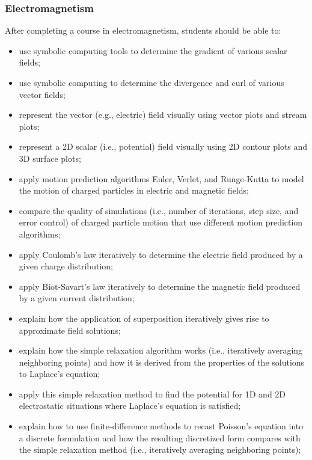 \documentclass[graybox,envcountchap,sectrefs]{svmult}
\begin{document}
\subsubsection{Electromagnetism}
After completing a course in electromagnetism, students should be able to:
\begin{itemize}
\item use symbolic computing  tools to determine the gradient of various scalar fields;

\item use symbolic computing  to determine the divergence and curl of various vector fields;

\item represent the vector (e.g., electric) field visually using vector plots and stream plots;

\item represent a 2D scalar (i.e., potential) field visually using 2D contour plots and 3D surface plots;

\item apply motion prediction algorithms Euler, Verlet, and Runge-Kutta to model the motion of charged particles in electric and magnetic fields;

\item compare the quality of simulations (i.e., number of iterations, step size, and error control) of charged particle motion that use different motion prediction algorithms;

\item apply Coulomb's law iteratively to determine the electric field produced by a given charge distribution;

\item apply Biot-Savart's law iteratively to determine the magnetic field produced by a given current distribution;

\item explain how the application of superposition iteratively gives rise to approximate field solutions;

\item explain how the simple relaxation algorithm works (i.e., iteratively averaging neighboring points) and how it is derived from the properties of the solutions to Laplace's equation;

\item apply this simple relaxation method to find the potential for 1D and 2D electrostatic situations where Laplace's equation is satisfied;

\item explain how to use  finite-difference methods to recast Poisson's equation into a discrete formulation and how the resulting discretized form compares with the simple relaxation method (i.e., iteratively averaging neighboring points);


\end{itemize}
\end{document}
